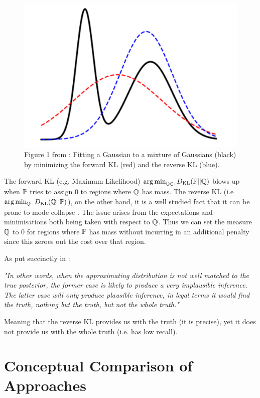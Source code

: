 \documentclass[a4paper,12pt,twoside,openright]{report}
\theoremstyle{definition}
\begin{document}
\begin{figure}
    \centering
    \includegraphics[scale=0.5]{images/zhang_et_al.PNG}
    \caption{Figure 1 from \cite{zhang2019variational}:  Fitting a Gaussian to a mixture of Gaussians (black) by
minimizing the forward KL (red) and the reverse KL (blue).}
    \label{fig:babrber_kl}
\end{figure}

The forward KL (e.g. Maximum Likelihood)  $\argmin_{\Q \in \cdot }\KL(\P ||\Q)$  blows up  when $\P$ tries to assign $0$ to regions where $\Q$ has mass. The reverse KL (i.e $\argmin_{\Q }$ $\KL(\Q ||\P)$), on the other hand, it is a well studied fact that it can be prone to mode collapse \citep{zhang2019variational}. The issue arises from the expectations and minimisations both being taken with respect to $\Q$. Thus we can set the measure $\Q$ to 0 for regions where $\P$ has mass without incurring in an additional penalty since this zeroes out the cost over that region.

As put succinctly in \cite{lawrence2001variational}:

\textit{"In other words, when the approximating distribution is not
well matched to the true posterior, the former case is likely to produce a very implausible inference.
The latter case will only produce plausible inference, in legal terms it would find the truth, nothing
but the truth, but not the whole truth."}

Meaning that the reverse KL provides us with the truth (it is precise), yet  it does not provide us with the whole truth (i.e. has low recall).

\section{Conceptual Comparison of Approaches}
\end{document}
